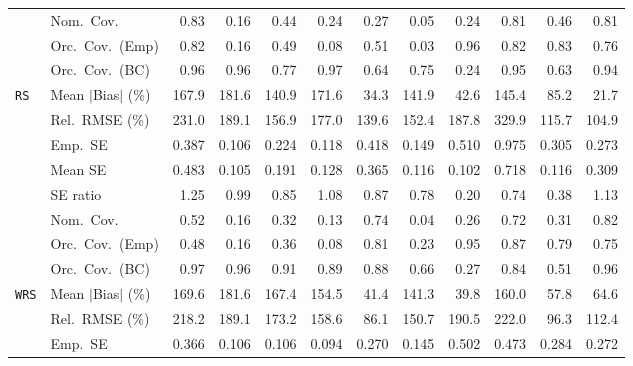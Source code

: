 \begin{landscape}
\begin{longtable}{llrrrrrrrrrr}
 & Nom.\ Cov. & \cellcolor{rankone}0.83 & 0.16 & 0.44 & 0.24 & 0.27 & 0.05 & 0.24 & \cellcolor{ranktwo}0.81 & \cellcolor{rankthree}0.46 & \cellcolor{ranktwo}0.81 \\
 & Orc.\ Cov.\ (Emp) & \cellcolor{rankthree}0.82 & 0.16 & 0.49 & 0.08 & 0.51 & 0.03 & \cellcolor{rankone}0.96 & \cellcolor{rankthree}0.82 & \cellcolor{ranktwo}0.83 & 0.76 \\
 & Orc.\ Cov.\ (BC) & \cellcolor{ranktwo}0.96 & \cellcolor{ranktwo}0.96 & 0.77 & \cellcolor{rankthree}0.97 & 0.64 & 0.75 & 0.24 & \cellcolor{rankone}0.95 & 0.63 & \cellcolor{ranktwo}0.94 \\
\addlinespace[2pt]
\quad \texttt{RS} & Mean $|$Bias$|$ (\%) & 167.9 & 181.6 & 140.9 & 171.6 & \cellcolor{ranktwo}34.3 & 141.9 & \cellcolor{rankthree}42.6 & 145.4 & 85.2 & \cellcolor{rankone}21.7 \\
 & Rel.\ RMSE (\%) & 231.0 & 189.1 & 156.9 & 177.0 & \cellcolor{rankthree}139.6 & 152.4 & 187.8 & 329.9 & \cellcolor{ranktwo}115.7 & \cellcolor{rankone}104.9 \\
 & Emp.\ SE & 0.387 & 0.106 & 0.224 & 0.118 & 0.418 & 0.149 & 0.510 & 0.975 & 0.305 & 0.273 \\
 & Mean SE & 0.483 & 0.105 & 0.191 & 0.128 & 0.365 & 0.116 & 0.102 & 0.718 & 0.116 & 0.309 \\
 & SE ratio & 1.25 & \cellcolor{rankone}0.99 & 0.85 & \cellcolor{ranktwo}1.08 & \cellcolor{rankthree}0.87 & 0.78 & 0.20 & 0.74 & 0.38 & \cellcolor{rankthree}1.13 \\
 & Nom.\ Cov. & 0.52 & 0.16 & 0.32 & 0.13 & \cellcolor{ranktwo}0.74 & 0.04 & 0.26 & \cellcolor{rankthree}0.72 & 0.31 & \cellcolor{rankone}0.82 \\
 & Orc.\ Cov.\ (Emp) & 0.48 & 0.16 & 0.36 & 0.08 & \cellcolor{rankthree}0.81 & 0.23 & \cellcolor{rankone}0.95 & \cellcolor{ranktwo}0.87 & 0.79 & 0.75 \\
 & Orc.\ Cov.\ (BC) & \cellcolor{ranktwo}0.97 & \cellcolor{rankone}0.96 & \cellcolor{rankthree}0.91 & 0.89 & 0.88 & 0.66 & 0.27 & 0.84 & 0.51 & \cellcolor{rankone}0.96 \\
\addlinespace[2pt]
\quad \texttt{WRS} & Mean $|$Bias$|$ (\%) & 169.6 & 181.6 & 167.4 & 154.5 & \cellcolor{ranktwo}41.4 & 141.3 & \cellcolor{rankone}39.8 & 160.0 & \cellcolor{rankthree}57.8 & 64.6 \\
 & Rel.\ RMSE (\%) & 218.2 & 189.1 & 173.2 & 158.6 & \cellcolor{rankone}86.1 & 150.7 & 190.5 & 222.0 & \cellcolor{ranktwo}96.3 & \cellcolor{rankthree}112.4 \\
 & Emp.\ SE & 0.366 & 0.106 & 0.106 & 0.094 & 0.270 & 0.145 & 0.502 & 0.473 & 0.284 & 0.272 \\

\end{longtable}
\end{landscape}

